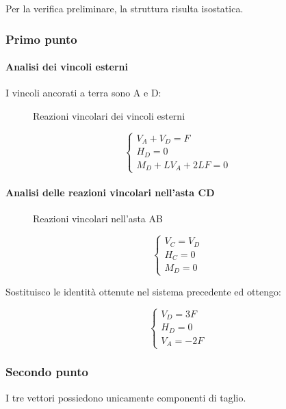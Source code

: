 \documentclass[main.tex]{subfiles}
\begin{document}
Per la verifica preliminare, la struttura risulta isostatica.

\subsubsection{Primo punto}

\paragraph{Analisi dei vincoli esterni}
I vincoli ancorati a terra sono A e D:

\begin{figure}[H]
\centering
\resizebox{.5\textwidth}{!}{}
\caption{Reazioni vincolari dei vincoli esterni}
\end{figure}

\[
\begin{cases}
	V_A + V_D= F \\
	H_D = 0 \\
	M_D + LV_A + 2LF = 0
\end{cases}
\]

\paragraph{Analisi delle reazioni vincolari nell'asta CD}

\begin{figure}[H]
\centering
\resizebox{.25\textwidth}{!}{}
\caption{Reazioni vincolari nell'asta AB}
\end{figure}

\[
\begin{cases}
	V_C = V_D\\
	H_C = 0\\
	M_D = 0
\end{cases}
\]

Sostituisco le identità ottenute nel sistema precedente ed ottengo:

\[
\begin{cases}
	V_D= 3F \\
	H_D = 0 \\
	V_A = -2F
\end{cases}
\]

\subsubsection{Secondo punto}
I tre vettori possiedono unicamente componenti di taglio.
\end{document}
